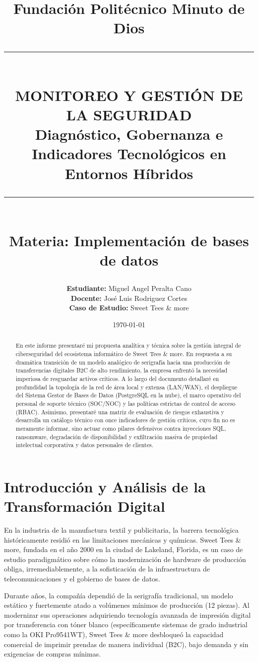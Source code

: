 \documentclass[11pt,a4paper]{article}
\title{
    \vspace*{2cm}
    \Large \textbf{Fundación Politécnico Minuto de Dios}\\[1.5cm]
    \rule{\textwidth}{1pt}\\[1cm]
    \Huge \textbf{\textcolor{primary}{MONITOREO Y GESTIÓN DE LA SEGURIDAD}} \\[0.5cm]
    \Large \textbf{Diagnóstico, Gobernanza e Indicadores Tecnológicos en Entornos Híbridos} \\
    \rule{\textwidth}{1pt}\\[1.5cm]
    \large \textbf{Materia:} Implementación de bases de datos
    \vspace*{1.5cm}
}
\author{
    \textbf{Estudiante:} Miguel Angel Peralta Cano\\[0.4cm]
    \textbf{Docente:} José Luis Rodriguez Cortes\\[0.4cm]
    \textbf{Caso de Estudio:} Sweet Tees \& more
}
\date{\vspace*{1.5cm} \today}
\begin{document}
\maketitle
\thispagestyle{empty}

\begin{abstract}
En este informe presentaré mi propuesta analítica y técnica sobre la gestión integral de ciberseguridad del ecosistema informático de Sweet Tees \& more. En respuesta a su dramática transición de un modelo analógico de serigrafía hacia una producción de transferencias digitales B2C de alto rendimiento, la empresa enfrentó la necesidad imperiosa de resguardar activos críticos. A lo largo del documento detallaré en profundidad la topología de la red de área local y extensa (LAN/WAN), el despliegue del Sistema Gestor de Bases de Datos (PostgreSQL en la nube), el marco operativo del personal de soporte técnico (SOC/NOC) y las políticas estrictas de control de acceso (RBAC). Asimismo, presentaré una matriz de evaluación de riesgos exhaustiva y desarrolla un catálogo técnico con once indicadores de gestión críticos, cuyo fin no es meramente informar, sino actuar como pilares defensivos contra inyecciones SQL, ransomware, degradación de disponibilidad y exfiltración masiva de propiedad intelectual corporativa y datos personales de clientes.
\end{abstract}
\newpage

\tableofcontents
\newpage

\section{Introducción y Análisis de la Transformación Digital}

En la industria de la manufactura textil y publicitaria, la barrera tecnológica históricamente residió en las limitaciones mecánicas y químicas. Sweet Tees \& more, fundada en el año 2000 en la ciudad de Lakeland, Florida, es un caso de estudio paradigmático sobre cómo la modernización de hardware de producción obliga, irremediablemente, a la sofisticación de la infraestructura de telecomunicaciones y el gobierno de bases de datos. 

Durante años, la compañía dependió de la serigrafía tradicional, un modelo estático y fuertemente atado a volúmenes mínimos de producción (12 piezas). Al modernizar sus operaciones adquiriendo tecnología avanzada de impresión digital por transferencia con tóner blanco (específicamente sistemas de grado industrial como la OKI Pro9541WT), Sweet Tees \& more desbloqueó la capacidad comercial de imprimir prendas de manera individual (B2C), bajo demanda y sin exigencias de compras mínimas.
\end{document}
